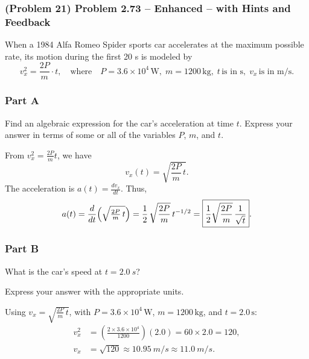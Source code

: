 \newpage

\subsubsection{(Problem 21) Problem 2.73 -- Enhanced -- with Hints and Feedback}

When a 1984 Alfa Romeo Spider sports car accelerates at the maximum possible rate, its motion during the first 20 s is modeled by
\[
	v_x^2 = \frac{2P}{m} \cdot t,\quad\text{where}\quad P = 3.6 \times 10^4\,\mathrm{W},\; m = 1200\,\mathrm{kg},\; t\,\text{is in s},\; v_x\,\text{is in m/s}.
\]

\subsubsection{Part A}
Find an algebraic expression for the car's acceleration at time \( t \).
Express your answer in terms of some or all of the variables \( P \), \( m \), and \( t \).

\begin{solution}
	From \( v_x^2 = \tfrac{2P}{m} t\), we have
	\[
		v_x(t) = \sqrt{\frac{2P}{m} \, t}.
	\]
	The acceleration is \( a(t) = \frac{dv_x}{dt} \). Thus,
	\begin{align*}
		a(t) &= \frac{d}{dt}\Bigl(\sqrt{\tfrac{2P}{m}\,t}\Bigr)
		= \frac{1}{2}\,\sqrt{\frac{2P}{m}}\,t^{-1/2}
		= \boxed{\frac{1}{2}\sqrt{\frac{2P}{m}}\,\frac{1}{\sqrt{t}}}.\\
	\end{align*}
\end{solution}

\subsubsection{Part B}
What is the car's speed at \( t = \SI{2.0}{s}\)?

Express your answer with the appropriate units.

\begin{solution}
	Using \( v_x = \sqrt{\tfrac{2P}{m}\,t}\), with \( P = 3.6\times10^4\,\mathrm{W} \), \( m = 1200\,\mathrm{kg} \), and \( t = 2.0\,\mathrm{s}\):
	\begin{align*}
		v_x^2 &= \left(\frac{2\times3.6\times10^4}{1200}\right) (2.0) = 60 \times 2.0 = 120,\\
		v_x &= \sqrt{120} \approx \SI{10.95}{m/s} \approx \boxed{\SI{11.0}{m/s}}.\\
	\end{align*}
\end{solution}

